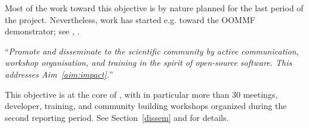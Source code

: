 \begin{compactenum}[\bf O1\rm:]
Most of the work toward this objective is by nature planned for the last period of the \pn
project. Nevertheless, work has started e.g.  toward the OOMMF demonstrator; see
,
.

\item \label{objective:disseminate} ``\emph{Promote and disseminate
  \ODK to the scientific community by active communication,
  workshop organisation, and training in the spirit of open-source
  software. This addresses Aim~\ref{aim:impact}.}''

This objective is at the core of , with in particular
more than 30 meetings, developer, training, and community building
workshops organized during the second reporting period. See
Section~\ref{dissem} and  for
details.
\end{compactenum}


